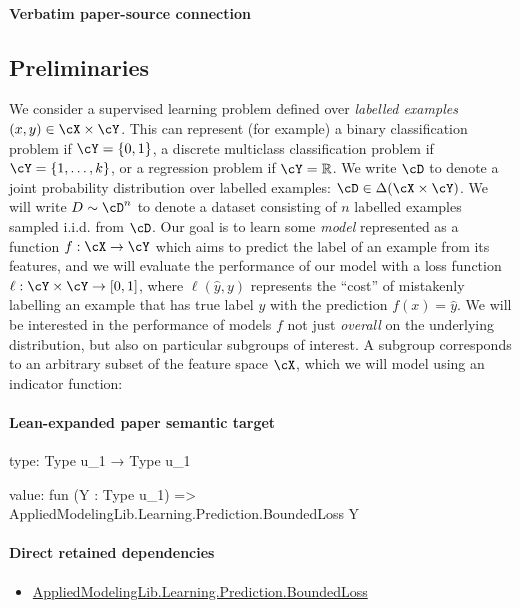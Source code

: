 \documentclass[10pt]{article}
\begin{document}
\paragraph{Verbatim paper-source connection}
\begin{ReviewVerbatim}
\section{Preliminaries}
We consider a supervised learning problem defined over \emph{labelled examples} $(x,y) \in \cX \times \cY$. This can represent (for example) a binary classification problem if $\cY = \{0,1\}$, a discrete multiclass classification problem if $\cY = \{1,\ldots,k\}$, or a regression problem if $\cY = \mathbb{R}$. We write $\cD$ to denote a joint probability distribution over labelled examples: $\cD \in \Delta (\cX \times \cY)$. We will write $D \sim \cD^n$ to denote a dataset consisting of $n$ labelled examples sampled i.i.d. from $\cD$. Our goal is to learn some \emph{model} represented as a function $f:\cX\rightarrow \cY$ which aims to predict the label of an example from its features, and we will evaluate the performance of our model with a loss function $\ell:\cY\times \cY \rightarrow [0,1]$, where $\ell(\hat y, y)$ represents the ``cost'' of mistakenly labelling an example that has true label $y$ with the prediction $f(x) = \hat y$. We will be interested in the performance of models $f$ not just \emph{overall} on the underlying distribution, but also on particular subgroups of interest. A subgroup corresponds to an arbitrary subset of the feature space $\cX$, which we will model using an indicator function:
\end{ReviewVerbatim}



\paragraph{Lean-expanded paper semantic target}
\begin{ReviewVerbatim}
type:
Type u_1 → Type u_1

value:
fun (Y : Type u_1) => AppliedModelingLib.Learning.Prediction.BoundedLoss Y
\end{ReviewVerbatim}

\paragraph{Direct retained dependencies}
\begin{itemize}\raggedright
\item \hyperlink{library-prerequisite-ce7caeacc1d4c7d3}{Applied\allowbreak{}Modeling\allowbreak{}Lib.\allowbreak{}Learning.\allowbreak{}Prediction.\allowbreak{}Bounded\allowbreak{}Loss}
\end{itemize}
\end{document}
